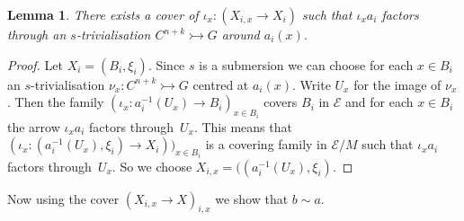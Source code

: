 \documentclass[10pt,a4paper]{amsart}
\numberwithin{equation}{section}
\newtheorem{Lemma}[Theorem]{Lemma}
\begin{document}
\begin{Lemma} There exists a cover of $\iota_x\colon (X_{i,x}\rightarrow X_i)$ such that $\iota_x a_i$ factors through an $s$-trivialisation $C^{n+k} \rightarrowtail G$ around $a_i(x)$.
\end{Lemma}
\begin{proof} Let $X_i = (B_i,\xi_i)$. Since $s$ is a submersion we can choose for each $x\in B_i$ an $s$-trivialisation $\nu_x\colon C^{n+k}\rightarrowtail G$ centred at $a_i(x)$. Write $U_x$ for the image of $\nu_x$. Then the family $(\iota_x\colon a_i^{-1}(U_x) \rightarrow B_i)_{x\in B_i}$ covers $B_i$ in $\mathcal{E}$ and for each $x\in B_i$ the arrow $\iota_x a_i$ factors through~$U_x$. This means that $(\iota_{x}\colon (a_i^{-1}(U_x),\xi_i) \rightarrow X_i))_{x\in B_i}$ is a covering family in $\mathcal{E}/M$ such that $\iota_x a_i$ factors through~$U_x$. So we choose $X_{i,x}=((a_i^{-1}(U_x),\xi_i)$.
\end{proof}

Now using the cover $(X_{i,x}\rightarrow X)_{i,x}$ we show that $b\sim a$.
\end{document}
